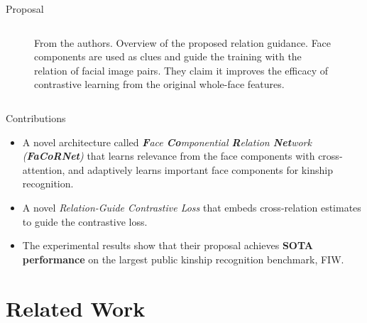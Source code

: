 \documentclass[aspectratio=169,xcolor=dvipsnames]{beamer}
\begin{document}
\begin{frame}{Proposal}
\begin{columns}[T]
\begin{column}{0.4\textwidth}
\begin{figure}
                \caption{From the authors. Overview of the proposed relation guidance. Face components are used as clues and guide the training with the relation of facial image pairs. They claim it improves the efficacy of contrastive learning from the original whole-face features.}
                \label{fig:kfc-model-overview}
            \end{figure}
        \end{column}
    \end{columns}
\end{frame}

\begin{frame}{Contributions}
    \begin{itemize}
        \item A novel architecture called \textit{\textbf{F}ace \textbf{Co}mponential \textbf{R}elation \textbf{Net}work (\textbf{FaCoRNet})} that learns relevance from the face components with cross-attention, and adaptively learns important face components for kinship recognition.
        \item A novel \textit{Relation-Guide Contrastive Loss} that embeds cross-relation estimates to guide the contrastive loss.
        \item The experimental results show that their proposal achieves \textbf{SOTA performance} on the largest public kinship recognition benchmark, FIW.
    \end{itemize}
    
\end{frame}

\section{Related Work}
\end{document}
